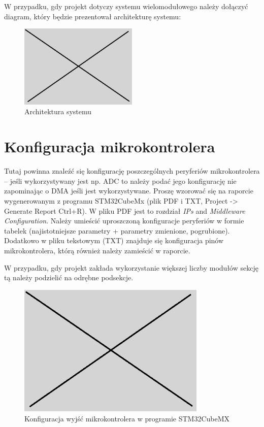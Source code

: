 \documentclass[10pt, a4paper]{article}
\begin{document}
W przypadku, gdy projekt dotyczy systemu 
wielomodułowego należy dołączyć diagram, który będzie prezentował
architekturę systemu:

\begin{figure}[H]
	\centering
	\includegraphics[width=0.5\textwidth]{figures/obraz.png}
	\caption{Architektura systemu}
	\label{fig:Architektura}
\end{figure}

\section{Konfiguracja mikrokontrolera}

Tutaj powinna znaleźć się konfigurację poszczególnych peryferiów 
mikrokontrolera -- jeśli wykorzystywany jest np. ADC to należy 
podać jego konfigurację nie zapominając o DMA jeśli jest 
wykorzystywane. Proszę wzorować się na raporcie wygenerowanym 
z programu STM32CubeMx 
(plik PDF i TXT, Project -> Generate Report Ctrl+R). 
W pliku PDF jest to rozdział \textit{IPs} and \textit{Middleware Configuration}. 
Należy umieścić uproszczoną konfiguracje peryferiów w formie 
tabelek (najistotniejsze parametry + parametry zmienione, pogrubione).
Dodatkowo w pliku tekstowym (TXT) znajduje się konfiguracja pinów 
mikrokontrolera, którą również należy zamieścić w raporcie.

W przypadku, gdy projekt zakłada wykorzystanie większej liczby modułów
sekcję tą należy podzielić na odrębne podsekcje.

\begin{figure}[H]
	\centering
	\includegraphics[width=0.8\textwidth]{figures/obraz.png}
	\caption{Konfiguracja wyjść mikrokontrolera w programie STM32CubeMX}
	\label{fig:KonfiguracjaMikrokontrolera}
\end{figure}
\end{document}
